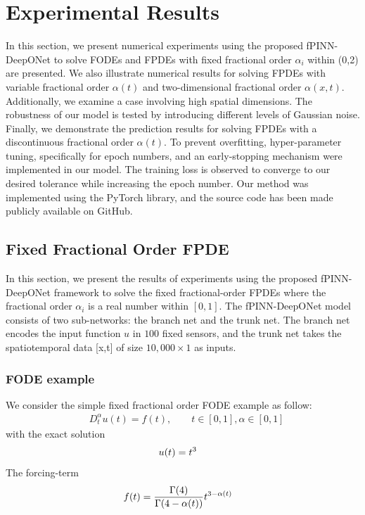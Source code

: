 \documentclass[11pt]{article}
\providecommand{\bh}[1]{#1}
\begin{document}
\section{Experimental Results}
\label{7.experimental results}
In this section, we present numerical experiments using the proposed fPINN-DeepONet to solve FODEs and FPDEs with fixed fractional order $\alpha_i$ within (0,2) are presented. We also illustrate numerical results for solving FPDEs with variable fractional order  $\alpha(t)$ and two-dimensional fractional order $\alpha(x,t)$. Additionally, we examine a case involving high spatial dimensions. The robustness of our model is tested by introducing different levels of Gaussian noise. Finally, we demonstrate the prediction results for solving FPDEs with a discontinuous fractional order $\alpha(t)$. \bh{To prevent overfitting, hyper-parameter tuning, specifically for epoch numbers, and an early-stopping mechanism were implemented in our model. The training loss is observed to converge to our desired tolerance while increasing the epoch number.} Our method was implemented using the PyTorch library, and the source code has been made publicly available on GitHub.
\subsection{Fixed Fractional Order FPDE}
In this section, we present the results of experiments using the proposed fPINN-DeepONet framework to solve the fixed fractional-order FPDEs where the fractional order $\alpha_i$ is a real number within $[0,1]$. The fPINN-DeepONet model consists of two sub-networks: the branch net and the trunk net. The branch net encodes the input function $u$ in $100$ fixed sensors, and the trunk net takes the spatiotemporal data [x,t] of size $10,000 \times 1$ as inputs. 
\subsubsection{FODE example}
We consider the simple fixed fractional order FODE example as follow:
\begin{eqnarray}\label{FODE equation}
&  D_t^{\alpha}u(t) = f(t), \qquad  t \in [0,1], \alpha \in [0,1]
\end{eqnarray}
with the exact solution
\begin{eqnarray}\label{FODE equation}
\notag &  u(t) = t^3
\end{eqnarray}
The forcing-term
\begin{eqnarray}
\notag &  f(t)= \frac{\Gamma(4)}{\Gamma(4-\alpha(t))}t^{3-\alpha(t)}
\end{eqnarray}
\end{document}
